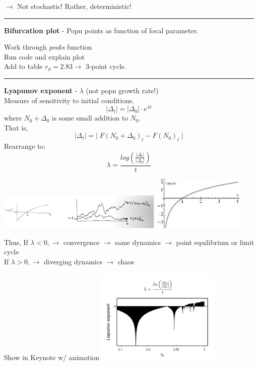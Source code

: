 \documentclass{article}
\newcommand{\note}[1]{\colorbox{gray!30}{#1}}
\newcommand{\ind}{\-\hspace{1cm}}
\begin{document}
$\to$ Not stochastic!  Rather, deterministic!

\rule[0.5ex]{\linewidth}{1pt}

\textbf{Bifurcation plot} - Popn points as function of focal parameter.

\ind \note{Work through \emph{peaks} function}\\
\ind \note{Run code and explain plot}\\
\ind \note{Add to table $r_d=2.83 \to$ 3-point cycle.}

\rule[0.5ex]{\linewidth}{1pt}

\textbf{Lyapunov exponent} - $\lambda$ (not popn growth rate!)\\
\ind Measure of sensitivity to initial conditions.\\
\begin{equation*}
	\vert \Delta_t \vert = \vert \Delta_0 \vert \cdot  e^{\lambda t}
\end{equation*}
\ind \ind where $N_0 + \Delta_0$ is some small addition to $N_0$.\\
That is,
\begin{equation*}
	\vert \Delta_t \vert = \vert \; F(N_0 + \Delta_0)_t - F(N_0)_t \; \vert
\end{equation*}
Rearrange to:
\begin{equation*}
	\lambda = \frac{log\left(\frac{\vert \Delta_t \vert}{\vert \Delta_0 \vert} \right)}{t}
\end{equation*}

\begin{center}
\includegraphics[width=8cm]{figs/Lyapunov.pdf}
\includegraphics[width=4.5cm]{figs/log.jpg}
\end{center}

Thus,
\ind If $\lambda < 0,  \to $ convergence $\to$ same dynamics $\to$ point equilibrium or limit cycle\\
\ind \ind If $\lambda > 0,  \to $ diverging dynamics $\to$ chaos

\begin{center}
\note{Show in Keynote w/ animation}
\includegraphics[width=6cm]{figs/Lyapunov2.pdf}
\end{center}
\end{document}
